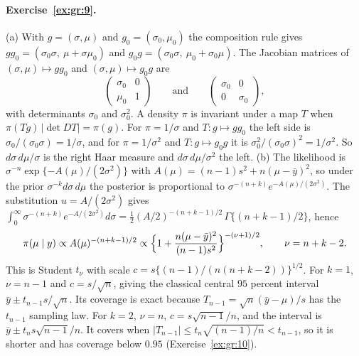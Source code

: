 \paragraph{Exercise~\ref{ex:gr:9}.} (a) With $g=(\sigma,\mu)$ and $g_0=(\sigma_0,\mu_0)$ the composition rule gives $gg_0=(\sigma_0\sigma,\ \mu+\sigma\mu_0)$ and $g_0g=(\sigma_0\sigma,\ \mu_0+\sigma_0\mu)$. The Jacobian matrices of $(\sigma,\mu)\mapsto gg_0$ and $(\sigma,\mu)\mapsto g_0g$ are
\[
\begin{pmatrix}\sigma_0&0\\\mu_0&1\end{pmatrix}\qquad\text{and}\qquad\begin{pmatrix}\sigma_0&0\\0&\sigma_0\end{pmatrix},
\]
with determinants $\sigma_0$ and $\sigma_0^2$. A density $\pi$ is invariant under a map $T$ when $\pi(Tg)\,|\det DT|=\pi(g)$. For $\pi=1/\sigma$ and $T:g\mapsto gg_0$ the left side is $\sigma_0/(\sigma_0\sigma)=1/\sigma$, and for $\pi=1/\sigma^2$ and $T:g\mapsto g_0g$ it is $\sigma_0^2/(\sigma_0\sigma)^2=1/\sigma^2$. So $d\sigma\,d\mu/\sigma$ is the right Haar measure and $d\sigma\,d\mu/\sigma^2$ the left. (b) The likelihood is $\sigma^{-n}\exp\{-A(\mu)/(2\sigma^2)\}$ with $A(\mu)=(n-1)s^2+n(\mu-\bar y)^2$, so under the prior $\sigma^{-k}d\sigma\,d\mu$ the posterior is proportional to $\sigma^{-(n+k)}e^{-A(\mu)/(2\sigma^2)}$. The substitution $u=A/(2\sigma^2)$ gives $\int_0^\infty\sigma^{-(n+k)}e^{-A/(2\sigma^2)}d\sigma=\tfrac12(A/2)^{-(n+k-1)/2}\,\Gamma\{(n+k-1)/2\}$, hence
\[
\pi(\mu\mid y)\propto A(\mu)^{-(n+k-1)/2}\propto\Bigl\{1+\frac{n(\mu-\bar y)^2}{(n-1)s^2}\Bigr\}^{-(\nu+1)/2},\qquad\nu=n+k-2.
\]
This is Student $t_\nu$ with scale $c=s\{(n-1)/(n(n+k-2))\}^{1/2}$. For $k=1$, $\nu=n-1$ and $c=s/\sqrt n$, giving the classical central $95$ percent interval $\bar y\pm t_{n-1}s/\sqrt n$. Its coverage is exact because $T_{n-1}=\sqrt n(\bar y-\mu)/s$ has the $t_{n-1}$ sampling law. For $k=2$, $\nu=n$, $c=s\sqrt{n-1}/n$, and the interval is $\bar y\pm t_ns\sqrt{n-1}/n$. It covers when $|T_{n-1}|\le t_n\sqrt{(n-1)/n}<t_{n-1}$, so it is shorter and has coverage below $0.95$ (Exercise~\ref{ex:gr:10}).

